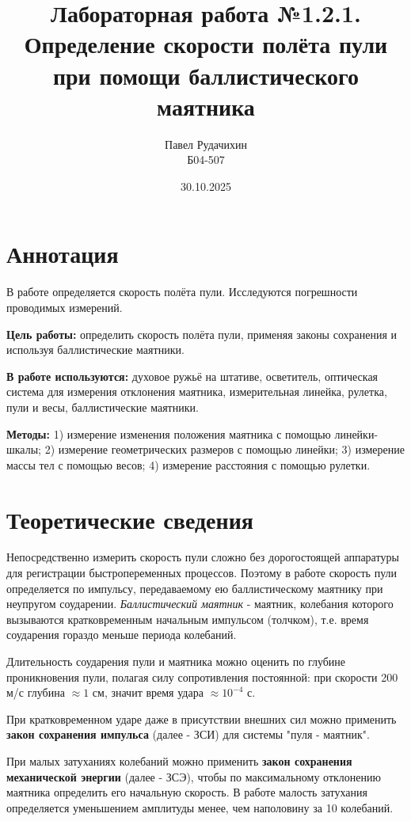 \documentclass{article}
\title{Лабораторная работа №1.2.1. \\ Определение скорости полёта пули при помощи баллистического маятника}
\author{Павел Рудачихин \\ Б04-507}
\date{30.10.2025}
\begin{document}
\maketitle{}
\section* {Аннотация} 

\hspace{4mm} В работе определяется скорость полёта пули. Исследуются погрешности проводимых измерений.

\textbf{Цель работы:} определить скорость полёта пули, применяя законы сохранения и используя баллистические маятники.

\textbf{В работе используются:} духовое ружьё на штативе, осветитель, оптическая система для измерения отклонения маятника, измерительная линейка, рулетка, пули и весы, баллистические маятники.

\textbf{Методы:} 1) измерение изменения положения маятника с помощью линейки-шкалы; 2) измерение геометрических размеров с помощью линейки; 3) измерение массы тел с помощью весов; 4) измерение расстояния с помощью рулетки.

\section* {Теоретические сведения}

\hspace{4mm} Непосредственно измерить скорость пули сложно без дорогостоящей аппаратуры для регистрации быстропеременных процессов. Поэтому в работе скорость пули определяется по импульсу, передаваемому ею баллистическому маятнику при неупругом соударении. \textit{Баллистический маятник} - маятник, колебания которого вызываются кратковременным начальным импульсом (толчком), т.е. время соударения гораздо меньше периода колебаний. 

Длительность соударения пули и маятника можно оценить по глубине проникновения пули, полагая силу сопротивления постоянной: при скорости 200 м/с глубина $\approx 1 $ см, значит время удара $\approx 10^{-4}$ с.

При кратковременном ударе даже в присутствии внешних сил можно применить \textbf{закон сохранения импульса} (далее - ЗСИ) для системы "пуля - маятник".

При малых затуханиях колебаний можно применить \textbf{закон сохранения механической энергии} (далее - ЗСЭ), чтобы по максимальному отклонению маятника определить его начальную скорость. В работе малость затухания определяется уменьшением амплитуды менее, чем наполовину за 10 колебаний.
\end{document}
